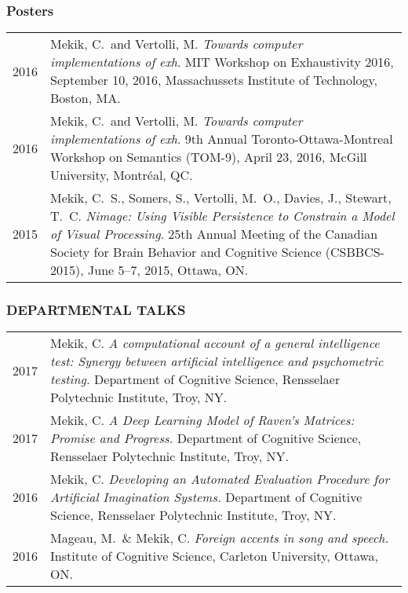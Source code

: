 \documentclass[12pt, letterpaper]{article}
\begin{document}
\subsubsection*{Posters}

\begin{longtable}{p{}p{}}
2016 & \noindent\hangindent=1cm Mekik, C.\ and Vertolli, M. \emph{Towards computer implementations of exh}. MIT Workshop on Exhaustivity 2016, September 10, 2016, Massachussets Institute of Technology, Boston, MA.\\

2016 & \noindent\hangindent=1cm Mekik, C.\ and Vertolli, M. \emph{Towards computer implementations of exh}. 9th Annual Toronto-Ottawa-Montreal Workshop on Semantics (TOM-9), April 23, 2016, McGill University, Montréal, QC.\\

2015 & \noindent\hangindent=1cm Mekik, C.\ S., Somers, S., Vertolli, M.\ O., Davies, J., Stewart, T.\ C. \emph{Nimage: Using Visible Persistence to Constrain a Model of Visual Processing}. 25th Annual Meeting of the Canadian Society for Brain Behavior and Cognitive Science (CSBBCS-2015), June 5--7, 2015, Ottawa, ON. \\
\end{longtable}

\subsubsection*{DEPARTMENTAL TALKS}
\begin{longtable}{p{}p{}}
2017&\noindent\hangindent=1cm Mekik, C. \emph{A computational account of a general intelligence test: Synergy between artificial intelligence and psychometric testing.} Department of Cognitive Science, Rensselaer Polytechnic Institute, Troy, NY.\\

2017&\noindent\hangindent=1cm Mekik, C. \emph{A Deep Learning Model of Raven's Matrices: Promise and Progress.} Department of Cognitive Science, Rensselaer Polytechnic Institute, Troy, NY.\\

2016&\noindent\hangindent=1cm Mekik, C. \emph{Developing an Automated Evaluation Procedure for Artificial Imagination Systems.} Department of Cognitive Science, Rensselaer Polytechnic Institute, Troy, NY.\\

2016&\noindent\hangindent=1cm Mageau, M.\ \& Mekik, C. \emph{Foreign accents in song and speech.} Institute of Cognitive Science, Carleton University, Ottawa, ON.
\end{longtable}
\end{document}
